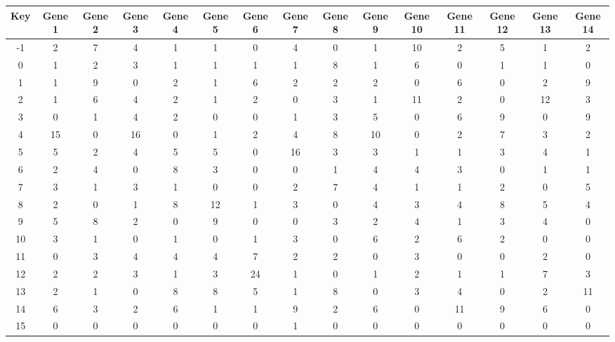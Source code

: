 \begin{tabular}{|c|c|c|c|c|c|c|c|c|c|c|c|c|c|c|}
\hline
Key & Gene 1 & Gene 2 & Gene 3 & Gene 4 & Gene 5 & Gene 6 & Gene 7 & Gene 8 & Gene 9 & Gene 10 & Gene 11 & Gene 12 & Gene 13 & Gene 14 \\
\hline
-1 & 2 & 7 & 4 & 1 & 1 & 0 & 4 & 0 & 1 & 10 & 2 & 5 & 1 & 2 \\
0 & 1 & 2 & 3 & 1 & 1 & 1 & 1 & 8 & 1 & 6 & 0 & 1 & 1 & 0 \\
1 & 1 & 9 & 0 & 2 & 1 & 6 & 2 & 2 & 2 & 0 & 6 & 0 & 2 & 9 \\
2 & 1 & 6 & 4 & 2 & 1 & 2 & 0 & 3 & 1 & 11 & 2 & 0 & 12 & 3 \\
3 & 0 & 1 & 4 & 2 & 0 & 0 & 1 & 3 & 5 & 0 & 6 & 9 & 0 & 9 \\
4 & 15 & 0 & 16 & 0 & 1 & 2 & 4 & 8 & 10 & 0 & 2 & 7 & 3 & 2 \\
5 & 5 & 2 & 4 & 5 & 5 & 0 & 16 & 3 & 3 & 1 & 1 & 3 & 4 & 1 \\
6 & 2 & 4 & 0 & 8 & 3 & 0 & 0 & 1 & 4 & 4 & 3 & 0 & 1 & 1 \\
7 & 3 & 1 & 3 & 1 & 0 & 0 & 2 & 7 & 4 & 1 & 1 & 2 & 0 & 5 \\
8 & 2 & 0 & 1 & 8 & 12 & 1 & 3 & 0 & 4 & 3 & 4 & 8 & 5 & 4 \\
9 & 5 & 8 & 2 & 0 & 9 & 0 & 0 & 3 & 2 & 4 & 1 & 3 & 4 & 0 \\
10 & 3 & 1 & 0 & 1 & 0 & 1 & 3 & 0 & 6 & 2 & 6 & 2 & 0 & 0 \\
11 & 0 & 3 & 4 & 4 & 4 & 7 & 2 & 2 & 0 & 3 & 0 & 0 & 2 & 0 \\
12 & 2 & 2 & 3 & 1 & 3 & 24 & 1 & 0 & 1 & 2 & 1 & 1 & 7 & 3 \\
13 & 2 & 1 & 0 & 8 & 8 & 5 & 1 & 8 & 0 & 3 & 4 & 0 & 2 & 11 \\
14 & 6 & 3 & 2 & 6 & 1 & 1 & 9 & 2 & 6 & 0 & 11 & 9 & 6 & 0 \\
15 & 0 & 0 & 0 & 0 & 0 & 0 & 1 & 0 & 0 & 0 & 0 & 0 & 0 & 0 \\
\hline
\end{tabular}
